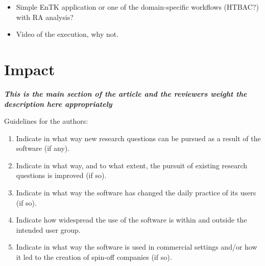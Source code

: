 \documentclass[preprint,12pt, a4paper]{elsarticle}
\begin{document}
\begin{itemize}
  \item Simple EnTK application or one of the domain-specific workflows
  (HTBAC?) with RA analysis?
  \item Video of the execution, why not.
\end{itemize}

\section{Impact}\label{sec:impact}

{\em \textbf{This is the main section of the article and the reviewers weight
the description here appropriately}

Guidelines for the authors:
\begin{enumerate}
  \item Indicate in what way new research questions can be pursued as a
  result of the software (if any).
  \item Indicate in what way, and to what extent, the pursuit of existing
  research questions is improved (if so).
  \item Indicate in what way the software has changed the daily practice of
  its users (if so).
  \item Indicate how widespread the use of the software is within and outside
  the intended user group.
  \item Indicate in what way the software is used in commercial settings
  and/or how it led to the creation of spin-off companies (if so).
\end{enumerate}}
\end{document}

